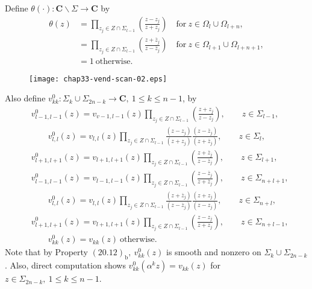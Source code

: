 \documentclass{surv-l}
\theoremstyle{plain}
\theoremstyle{definition}
\numberwithin{equation}{chapter}
\begin{document}
Define $\theta(\cdot):\mathbf{C}\backslash \Sigma\rightarrow \mathbf{C}$ by
\setcounter{equation}{24}
\begin{align}\label{eq33.25}
\theta(z)&=\prod_{z_{j}\in Z\cap\Sigma_{l-1}}\left(\frac{z-z_{j}}{z+z_{j}}\right)\quad \mathrm{for}\ z\in\Omega_{l}\cup\Omega_{l+n},\\
&=\displaystyle \prod_{z_{j}\in Z\cap\Sigma_{l-1}}\left(\frac{z+\overline{z}_{j}}{z-\overline{z}_{j}}\right) \quad \mathrm{for}\ z\in\Omega_{l+1}\cup\Omega_{l+n+1},\nonumber \\
&=1\ \mathrm{otherwise}.\nonumber
\end{align}
\begin{figure}
\texttt{[image: chap33-vend-scan-02.eps]}
\caption{}
\end{figure}
Also define $v_{kk}^{0}:\Sigma_{k}\cup\Sigma_{2n-k}\rightarrow \mathbf{C},\ 1\leq k\leq n-1$, by
\begin{align}\label{eq33.26}
&v_{l-1,l-1}^{0}(z)=v_{v-1,l-1}(z)\displaystyle \prod_{z_{j}\in Z\cap\Sigma_{l-1}}\left(\frac{z+z_{j}}{z-z_{j}}\right),\qquad z\in\Sigma_{l-1},\\\nonumber
&\qquad v_{l,l}^{0}(z)=v_{l,l}(z)\prod_{z_{j}\in Z\cap\Sigma_{l-1}}\frac{(z-z_{j})}{(z+z_{j})}\frac{(z-\overline{z}_{j})}{(z+\overline{z}_{j})},\qquad z\in\Sigma_{l},\\\nonumber
& v_{l+1,l+1}^{0}(z)=v_{l+1,l+1}(z)\prod_{z_{j}\in Z\cap\Sigma_{l-1}}\left(\frac{z+\overline{z}_{j}}{z-\overline{z}_{j}}\right),\qquad z\in\Sigma_{l+1},\\\nonumber
& v_{l-1,l-1}^{0}(z)=v_{l-1,l-1}(z)\prod_{z_{j}\in Z\cap\Sigma_{l-1}}\left(\frac{z-\overline{z}_{j}}{z+\overline{z}_{j}}\right),\qquad z\in\Sigma_{n+l+1},\\\nonumber
&\qquad v_{l,l}^{0}(z)=v_{l,l}(z)\prod_{z_{j}\in Z\cap\Sigma_{l-1}}\frac{(z+\overline{z}_{j})}{(z-\overline{z}_{j})}\frac{(z+z_{j})}{(z-z_{j})},\qquad z\in\Sigma_{n+l},\\\nonumber
&v_{l+1,l+1}^{0}(z)=v_{l+1,l+1}(z)\prod_{z_{j}\in Z\cap\Sigma_{l-1}}\left(\frac{z-z_{j}}{z+z_{j}}\right),\qquad z\in\Sigma_{n+l-1},\\\nonumber
&\qquad v_{kk}^{0}(z)=v_{kk}(z)\ \mathrm{otherwise}.
\end{align}
Note that by Property $(20.12)_{\mathrm{b}},\ v_{kk}^{0}(z)$ is smooth and nonzero on $\Sigma_{k}\cup\Sigma_{2n-k}$. Also, direct computation shows $v_{kk}^{0}(\alpha^{k}z)=v_{kk}(z)$ for $z\in\Sigma_{2n-k},\ 1\leq k\leq n -1$.
\end{document}
